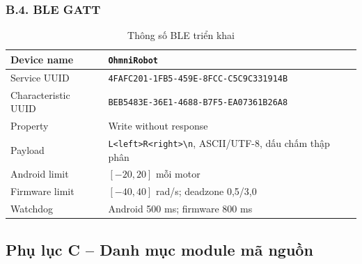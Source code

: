 \subsubsection*{B.4. BLE GATT}

\begin{table}[htbp]
\centering
\caption{Thông số BLE triển khai}
\begin{tabularx}{\textwidth}{|p{4.0cm}|X|}
\hline
Device name & \texttt{OhmniRobot} \\
\hline
Service UUID & \texttt{4FAFC201-1FB5-459E-8FCC-C5C9C331914B} \\
\hline
Characteristic UUID & \texttt{BEB5483E-36E1-4688-B7F5-EA07361B26A8} \\
\hline
Property & Write without response \\
\hline
Payload & \texttt{L<left>R<right>\textbackslash n}, ASCII/UTF-8, dấu chấm thập phân \\
\hline
Android limit & $[-20,20]$ mỗi motor \\
\hline
Firmware limit & $[-40,40]$ rad/s; deadzone 0,5/3,0 \\
\hline
Watchdog & Android 500 ms; firmware 800 ms \\
\hline
\end{tabularx}
\end{table}

\subsection*{Phụ lục C -- Danh mục module mã nguồn}

